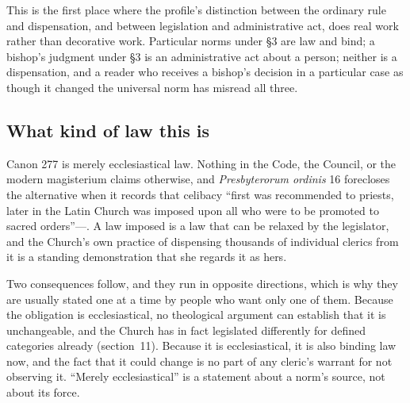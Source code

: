 This is the first place where the profile's distinction between the ordinary rule and dispensation, and between legislation and administrative act, does real work rather than decorative work. Particular norms under §3 are law and bind; a bishop's judgment under §3 is an administrative act about a person; neither is a dispensation, and a reader who receives a bishop's decision in a particular case as though it changed the universal norm has misread all three.

\subsection{What kind of law this is}

Canon 277 is merely ecclesiastical law. Nothing in the Code, the Council, or the modern magisterium claims otherwise, and \emph{Presbyterorum ordinis} 16 forecloses the alternative when it records that celibacy ``first was recommended to priests, later in the Latin Church was imposed upon all who were to be promoted to sacred orders''---. A law imposed is a law that can be relaxed by the legislator, and the Church's own practice of dispensing thousands of individual clerics from it is a standing demonstration that she regards it as hers.

Two consequences follow, and they run in opposite directions, which is why they are usually stated one at a time by people who want only one of them. Because the obligation is ecclesiastical, no theological argument can establish that it is unchangeable, and the Church has in fact legislated differently for defined categories already (section~11). Because it is ecclesiastical, it is also binding law now, and the fact that it could change is no part of any cleric's warrant for not observing it. ``Merely ecclesiastical'' is a statement about a norm's source, not about its force.

